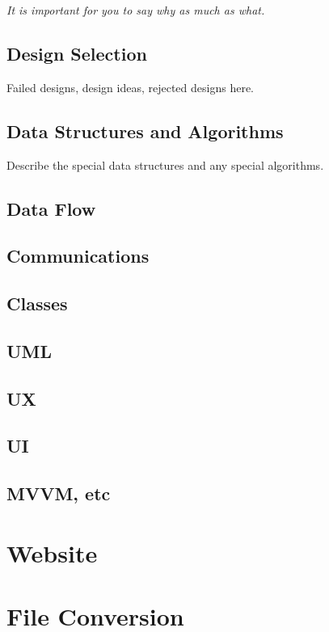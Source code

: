  
 {\it It is important for you to say why as much as what.   }
 
   \subsection{Design Selection}
 Failed designs, design ideas, rejected designs here.
 
 \subsection{Data Structures and Algorithms}
 Describe the special data structures and any special algorithms.
 
 \subsection{Data Flow}
 
 \subsection{Communications}
 
 \subsection{Classes}
 
 \subsection{UML}
 
 \subsection{UX}
 
 \subsection{UI}
 
 \subsection{MVVM, etc}

 \section{Website}

 \section{File Conversion}

